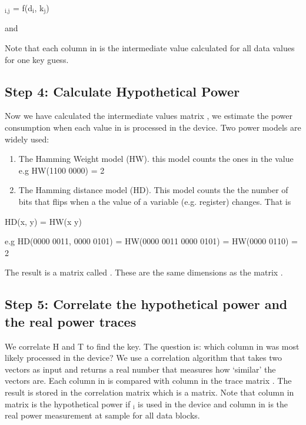 \documentclass[letterpaper,10pt,english]{sphinxmanual}
\begin{document}
$_{\text{i,j}}$ = f(d$_{\text{i}}$, k$_{\text{j}}$)

and 

Note that each column in  is the intermediate value calculated for all data values  for one key guess.


\subsection{Step 4: Calculate Hypothetical Power}
\label{\detokenize{cpa:step-4-calculate-hypothetical-power}}
Now we have calculated the intermediate values matrix , we estimate the power consumption when each value in  is processed in the device.
Two power models are widely used:
\begin{enumerate}
\def\theenumi{\arabic{enumi}}
\def\labelenumi{\theenumi .}
\makeatletter\def\p@enumii{\p@enumi \theenumi .}\makeatother
\item {} 
The Hamming Weight model (HW). this model counts the ones in the value e.g HW(1100 0000) = 2

\item {} 
The Hamming distance model (HD). This model counts the the number of bits that flips when a the value of a variable (e.g. register) changes. That is

\end{enumerate}

HD(x, y) = HW(x  y)

e.g HD(0000 0011, 0000 0101) = HW(0000 0011  0000 0101) = HW(0000 0110) = 2

The result is a  matrix called . These are the same dimensions as the matrix .


\subsection{Step 5: Correlate the hypothetical power and the real power traces}
\label{\detokenize{cpa:step-5-correlate-the-hypothetical-power-and-the-real-power-traces}}
We correlate H and T to find the key. The question is: which column in  was most likely processed in the device?
We use a correlation algorithm that takes two vectors as input and returns a real number that measures how ‘similar’ the vectors are.
Each column  in  is compared with column  in the trace matrix . The result is stored in the correlation matrix  which is a  matrix.
Note that column  in matrix  is the hypothetical power if $_{\text{i}}$ is used in the device and column  in  is the real power measurement at sample  for all data blocks.
\end{document}
